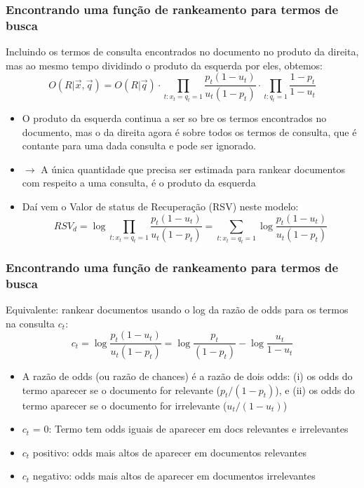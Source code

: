 \documentclass[compress]{beamer}
\def\myblue#1{\textcolor{texblue}{#1}}
\begin{document}
\begin{frame}[<+->]
\frametitle{Encontrando uma função de rankeamento para termos de busca}
\pause[2]

Incluindo os termos de consulta encontrados no documento no produto da direita, mas   ao mesmo tempo dividindo o produto da esquerda por eles, obtemos:
\begin{equation}
\nonumber
O(R|\vec{x},\vec{q}) = O(R|\vec{q}) \cdot
\prod_{t: x_t = q_t =1}
\frac{p_t(1-u_t)}{u_t(1-p_t)} \cdot
\prod_{t: q_t=1}
\frac{1-p_t}{1-u_t}
\end{equation}

\begin{itemize}
\item O produto da esquerda continua a ser so bre os termos encontrados no documento, mas o da direita agora é sobre todos os termos de consulta, que é contante para uma dada consulta e pode ser ignorado. 

\item $\rightarrow$ \myblue{A única quantidade que precisa ser estimada para rankear documentos com respeito a uma consulta, é o produto da esquerda} 


\item Daí vem o  \myblue{Valor de status de Recuperação} (RSV) neste modelo:
\begin{equation}
\nonumber
RSV_d = \log \prod_{t: x_t = q_t =1} \frac{p_t(1-u_t)}{u_t(1-p_t)} =
\sum_{t: x_t = q_t =1} \log \frac{p_t(1-u_t)}{u_t(1-p_t)}
\end{equation}
\end{itemize}
\end{frame}
\begin{frame}[<+->]
\frametitle{Encontrando uma função de rankeamento para termos de busca}
\pause[2]

Equivalente: rankear documentos usando o \myblue{log da razão de odds} para os termos na consulta $c_t$:
\begin{equation}
\nonumber
c_t = \log \frac{p_t(1-u_t)}{u_t(1-p_t)} = \log \frac{p_t}{(1-p_t)} - \log \frac{u_t}{1-u_t}
\end{equation}
\begin{itemize}

\item A  \myblue{razão de odds } (ou razão de chances) é a razão de dois odds: (i) os odds do termo aparecer se o documento for relevante ($p_t/(1-p_t)$), e (ii)
os odds do termo aparecer se o documento for irrelevante ($u_t/(1-u_t)$) %

\item $c_t$ = 0: Termo tem odds iguais de aparecer em docs relevantes e irrelevantes
\item $c_t$ positivo: odds mais altos de aparecer em documentos relevantes
\item $c_t$ negativo: odds mais altos de aparecer em documentos irrelevantes
\end{itemize}
\end{frame}
\end{document}
